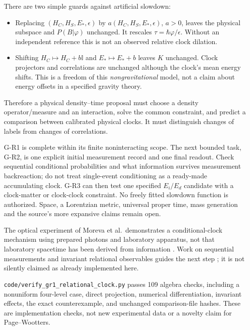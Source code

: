 \documentclass[11pt,a4paper]{article}
\newcommand{\id}{\mathbb I}
\begin{document}
There are two simple guards against artificial slowdown:
\begin{itemize}
\item Replacing $(H_C,H_S,E_*,\epsilon)$ by
$a(H_C,H_S,E_*,\epsilon)$, $a>0$, leaves the physical subspace and
$P(B|\varphi)$ unchanged. It rescales $\tau=\hbar\varphi/\epsilon$.
Without an independent reference this is not an observed relative
clock dilation.
\item Shifting $H_C\mapsto H_C+b\id$ and $E_*\mapsto E_*+b$
leaves $K$ unchanged. Clock projectors and correlations are unchanged
although the clock's mean energy shifts. This is a freedom of this
\emph{nongravitational} model, not a claim about energy offsets in a
specified gravity theory.
\end{itemize}
Therefore a physical density--time proposal must choose a density
operator/measure and an interaction, solve the common constraint, and
predict a comparison between calibrated physical clocks. It must
distinguish changes of labels from changes of correlations.

G-R1 is complete within its finite noninteracting scope. The next
bounded task, G-R2, is one explicit initial measurement record and one
final readout. Check sequential conditional probabilities and what
information survives measurement backreaction; do not treat
single-event conditioning as a ready-made accumulating clock.
G-R3 can then test one specified $E_i/E_d$ candidate with a clock-matter
or clock-clock constraint. No freely fitted slowdown function is
authorized. Space, a Lorentzian metric, universal proper time, mass
generation and the source's more expansive claims remain open.

The optical experiment of Moreva et al.\ demonstrates a conditional-clock
mechanism using prepared photons and laboratory apparatus, not that
laboratory spacetime has been derived from information \cite{moreva}.
Work on sequential measurements and invariant relational observables
guides the next step \cite{quantumtime,trinity}; it is not silently
claimed as already implemented here.

\texttt{code/verify\_gr1\_relational\_clock.py} passes 109 algebra checks,
including a nonuniform four-level case, direct projection, numerical
differentiation, invariant effects, the exact counterexample, and
unchanged comparison-file hashes. These are implementation checks,
not new experimental data or a novelty claim for Page--Wootters.
\end{document}

